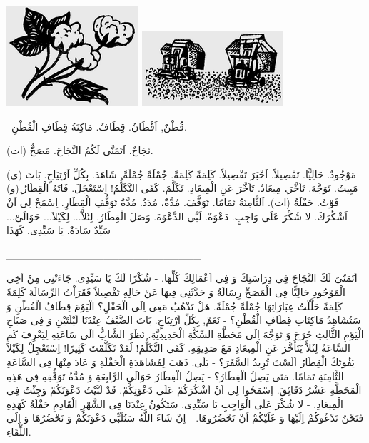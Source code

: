 \documentclass[a5paper]{article}
\begin{document}
 \includegraphics[width=1.9272in,height=1.4689in]{images/MuhammadBagauddinprettified-img221.png}   \includegraphics[width=2.0626in,height=1.1043in]{images/MuhammadBagauddinprettified-img222.png} 

\ قُطْنٌ, اَقْطَانٌ. قِطَافٌ. مَاكِنَةُ قِطَافِ الْقُطْنِ. 

نَجَاحٌ. اَتَمَنَّى لَكُمُ النَّجَاحَ. مَصَحٌّّ (ات).

مَوْجُودٌ. حَالِيًّا. تَفْصِيلاً. اَخْبَرَ تَفْصِيلاً. كَلِمَةً كَلِمَةً. جُمْلَةً جُمْلَةً. شَاهَدَ. بِكُلِّ اَرْتِيَاحٍ. بَاتَ (ى) مَبِيتٌ. تَوَجَّهَ. تَاَخَّرَ.ِ مِيعَادٌ. تَاَخَّرَ عَنِ الْمِيعَادِ. تَكَلَّمَ. كَفَى التَّكَلُّمُ! اِسْتَعْجَلَ. فَاتَهُ الْقِطَارُ ِ(و) فَوْتٌ. حَفْلَةٌ (ات). اَلثَّامِنَةُ تَمَامًا. تَوَقَّفَ. مُدَّةٌ، مُدَدٌ. مُدَّةُ تَوَقُّفِ الْقِطَارِ. اِسْمَحْ لِى اَنْ اَشْكُرَكَ. لا شُكْرَ عَلَى وَاجِبٍ. دَعْوَةٌ. لَبَّى الدَّعْوَةَ. وَصَلَ الْقِطَارُ. لِئَلاَّ... لِكَيْلاَ... حَوَالَىْ... سَيِّدٌ سَادَةٌ. يَا سَيِّدِى. كَهَذَا

\_\_\_\_\_\_\_\_\_\_\_\_\_\_\_\_\_\_\_\_\_\_\_\_\_\_

اَتَمَنّىَ لَكَ النَّجَاحَ فِى دِرَاسَتِكَ وَ فِى اَعْمَالِكَ كُلِّهَا. - شُكْرًا لَكَ يَا سَيِّدِى. جَاءَتْنِى مِنْ اَخِى الْمَوْجُودِ حَالِيًّا فِى الْمَصَحِّ رِسَالَةٌ وَ حَدَّثَنِى فِيهَا عَنْ حَالِهِ تَفْصِيلاً فَقَرَاْتُ الرِّسَالَةَ كَلِمَةً كَلِمَةً حَلَّلْتُ عِبَارَاتِهَا جُمْلَةً جُمْلَةً. هَلْ تَذْهُبُ مَعِى اِلَى الْحَقْلِ؟ الْيَوْمَ قِطَافُ الْقُطْنِ وَ سَتُشَاهِدُ مَاكِنَاتِ قِطَافِ الْقُطْنِ؟ - نَعَمْ, بِكُلِّ اَرْتِيَاحٍ. بَاتَ الضَّيْفُ عِنْدَنَا لَيْلَتَيْنِ وَ فِى صَبَاحِ الْيَوْمِ الثَّالِثِ خَرَجَ وَ تَوَجَّهَ اِلَى مَحَطَّةِ السِّكَّةِ الْحَدِيدِيَّةِ. نَظَرَ الشَّابُّ الَى سَاعَتِهِ لِيَعْرِفَ كَمِ السَّاعَةُ لِئَلاَّ يَتَأَخَّرَ عَنِ الْمِيعَادِ مَعَ صَدِيقِهِ. كَفَى التَّكَلُّمُ! لَقَدْ تَكَلَّمْتَ كَثِيرًا! اِسْتَعْجِلْ لِكَيْلاَ يَفُوتَكَ الْقِطَارُ اَلَسْتَ تُرِيدُ السَّفَرَ؟ - بَلَى. ذَهَبَ لِمُشَاهَدَةِ الْحَفْلَةِ وَ عَادَ مِنْهَا فِى السَّاعَةِ الثَّامِنَةِ تَمَامًا. مَتَى يَصِلُ الْقِطَارُ؟ - يَصِلُ الْقِطَارُ حَوَالَىِ الرَّابِعَةِ وَ مُدَّةُ تَوَقُّفِهِ فِى هَذِهِ الْمَحَطَّةِ عَشْرُ دَقَائِقَ. اِسْمَحُوا لِى اَنْ اَشْكُرَكُمْ عَلَى دَعْوَتِكُمْ. قَدْ لَبَّيْتُ دَعْوَتَكُمْ وَجِئْتُ فِى الْمِيعَادِ. - لا شُكْرَ عَلَى الْوَاجِبِ يَا سَيِّدِى. سَتَكُونُ عِنْدَنَا فِى الشَّهْرِ الْقَادِمِ حَفْلَةٌ كَهَذِهِ فَنَحْنُ نَدْعُوكُمْ اِلَيْهَا وَ عَلَيْكُمْ اَنْ تَحْضُرُوهَا. - اِنْ شَاءَ اللَّهُ سَنُلَبِّى دَعْوَتَكُمْ وَ نَحْضُرُهَا وَ اِلَى اللِّقَاءِ.
\end{document}
